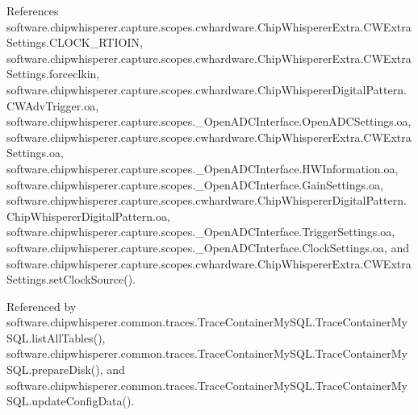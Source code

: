 References software.\+chipwhisperer.\+capture.\+scopes.\+cwhardware.\+Chip\+Whisperer\+Extra.\+C\+W\+Extra\+Settings.\+C\+L\+O\+C\+K\+\_\+\+R\+T\+I\+O\+I\+N, software.\+chipwhisperer.\+capture.\+scopes.\+cwhardware.\+Chip\+Whisperer\+Extra.\+C\+W\+Extra\+Settings.\+forceclkin, software.\+chipwhisperer.\+capture.\+scopes.\+cwhardware.\+Chip\+Whisperer\+Digital\+Pattern.\+C\+W\+Adv\+Trigger.\+oa, software.\+chipwhisperer.\+capture.\+scopes.\+\_\+\+Open\+A\+D\+C\+Interface.\+Open\+A\+D\+C\+Settings.\+oa, software.\+chipwhisperer.\+capture.\+scopes.\+cwhardware.\+Chip\+Whisperer\+Extra.\+C\+W\+Extra\+Settings.\+oa, software.\+chipwhisperer.\+capture.\+scopes.\+\_\+\+Open\+A\+D\+C\+Interface.\+H\+W\+Information.\+oa, software.\+chipwhisperer.\+capture.\+scopes.\+\_\+\+Open\+A\+D\+C\+Interface.\+Gain\+Settings.\+oa, software.\+chipwhisperer.\+capture.\+scopes.\+cwhardware.\+Chip\+Whisperer\+Digital\+Pattern.\+Chip\+Whisperer\+Digital\+Pattern.\+oa, software.\+chipwhisperer.\+capture.\+scopes.\+\_\+\+Open\+A\+D\+C\+Interface.\+Trigger\+Settings.\+oa, software.\+chipwhisperer.\+capture.\+scopes.\+\_\+\+Open\+A\+D\+C\+Interface.\+Clock\+Settings.\+oa, and software.\+chipwhisperer.\+capture.\+scopes.\+cwhardware.\+Chip\+Whisperer\+Extra.\+C\+W\+Extra\+Settings.\+set\+Clock\+Source().



Referenced by software.\+chipwhisperer.\+common.\+traces.\+Trace\+Container\+My\+S\+Q\+L.\+Trace\+Container\+My\+S\+Q\+L.\+list\+All\+Tables(), software.\+chipwhisperer.\+common.\+traces.\+Trace\+Container\+My\+S\+Q\+L.\+Trace\+Container\+My\+S\+Q\+L.\+prepare\+Disk(), and software.\+chipwhisperer.\+common.\+traces.\+Trace\+Container\+My\+S\+Q\+L.\+Trace\+Container\+My\+S\+Q\+L.\+update\+Config\+Data().


